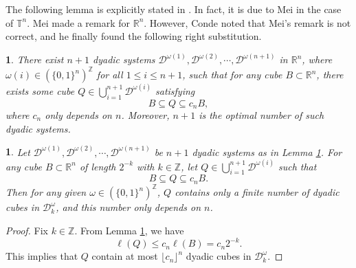 \documentclass[oneside,english,a4wide]{amsart}
\numberwithin{equation}{section}
\numberwithin{figure}{section}
\theoremstyle{plain}
\theoremstyle{plain}
\theoremstyle{definition}
\theoremstyle{plain}
\newtheorem{lem}[thm]{\protect\lemmaname}
\theoremstyle{remark}
\newtheorem{rem}[thm]{\protect\remarkname}
\theoremstyle{definition}
\theoremstyle{remark}
\theoremstyle{definition}
\providecommand{\lemmaname}{Lemma}
\providecommand{\remarkname}{Remark}
\newcommand{\8}{\infty}
\begin{document}
The following lemma is explicitly stated in \cite{CJM2013}. In fact, it is due to Mei \cite{Mei4} in the case of $\mathbb{T}^n$. Mei made a remark \cite[Remark 7]{Mei4} for $\mathbb{R}^n$. However, Conde \cite{CJM2013} noted that Mei's remark is not correct, and he finally found the following right substitution.
	\begin{lem}\label{Domegan1}
	There exist $n+1$ dyadic systems $\mathcal{D}^{\omega(1)},\mathcal{D}^{\omega(2)},\cdots,\mathcal{D}^{\omega(n+1)}$ in $\mathbb{R}^n$, where $\omega(i)\in(\{0,1\}^n)^\mathbb{Z}$ for all $ 1\le i\le n+1$, such that for any cube $B\subset\mathbb{R}^n$, there exists some cube $Q\in \bigcup\limits_{i=1}^{n+1} \mathcal{D}^{\omega(i)}$ satisfying
    \begin{equation*}
    	B\subseteq Q\subseteq c_n B,
    \end{equation*}
where $c_n$ only depends on $n$. Moreover, $n+1$ is the optimal number of such dyadic systems.
\end{lem}
\begin{lem}\label{Domegan2}
	Let $\mathcal{D}^{\omega(1)},\mathcal{D}^{\omega(2)},\cdots,\mathcal{D}^{\omega(n+1)}$ be $n+1$ dyadic systems as in Lemma \ref{Domegan1}. For any cube $B\subset \mathbb{R}^n$ of length $2^{-k}$ with $k\in\mathbb{Z}$, let $Q\in\bigcup\limits_{i=1}^{n+1} \mathcal{D}^{\omega(i)}$ such that
	\begin{equation*}
		B\subseteq Q\subseteq c_n B.
	\end{equation*}
  Then for any given $\omega\in(\{0,1\}^n)^\mathbb{Z}$, $Q$ contains only a finite number of dyadic cubes in $\mathcal{D}_k^\omega$, and this number only depends on $n$.
\end{lem}
\begin{proof}
	Fix $k\in\mathbb{Z}$. From Lemma \ref{Domegan1}, we have
	\begin{equation*}
		\ell(Q)\le c_n \ell(B)=c_n2^{-k}.
	\end{equation*}
This implies that $Q$ contain at most $\lfloor c_n\rfloor^n$ dyadic cubes in $\mathcal{D}_k^\omega$.
\end{proof}
\end{document}

